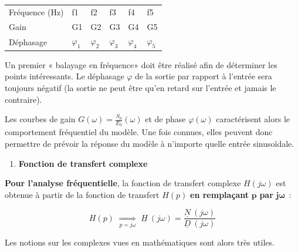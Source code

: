 \begin{longtable}[]{@{}
  >{\raggedright\arraybackslash}p{}
  >{\raggedright\arraybackslash}p{}
  >{\raggedright\arraybackslash}p{}
  >{\raggedright\arraybackslash}p{}
  >{\raggedright\arraybackslash}p{}
  >{\raggedright\arraybackslash}p{}@{}}
\toprule\noalign{}
\endhead
\bottomrule\noalign{}
\endlastfoot
Fréquence (Hz) & f1 & f2 & f3 & f4 & f5 \\
Gain & G1 & G2 & G3 & G4 & G5 \\
Déphasage & \(\varphi_{1}\) & \(\varphi_{2}\) & \(\varphi_{3}\) & \(\varphi_{4}\) & \(\varphi_{5}\) \\
\end{longtable}

Un premier « balayage en fréquence» doit être réalisé afin de déterminer les points intéressants. Le déphasage \(\varphi\) de la sortie par rapport à l'entrée sera toujours négatif (la sortie ne peut être qu'en retard sur l'entrée et jamais le contraire).

Les courbes de gain \(G(\omega) = \frac{S_{0}}{E_{0}}(\omega)\) et de phase \(\varphi(\omega)\) caractérisent alors le comportement fréquentiel du modèle. Une fois connues, elles peuvent donc permettre de prévoir la réponse du modèle à n'importe quelle entrée sinusoïdale.

\begin{enumerate}
\def\labelenumi{\arabic{enumi}.}
\setcounter{enumi}{2}
\item
  \protect\hypertarget{_Toc387521156}{}{}\textbf{Fonction de transfert complexe}
\end{enumerate}

\textbf{Pour l'analyse fréquentielle}, la fonction de transfert complexe \(H(j\omega)\) est obtenue à partir de la fonction de transfert \(H(p)\) \textbf{en remplaçant} \(\mathbf{p}\) \textbf{par} \(\mathbf{j\omega}\)~:

\[H(p)\mspace{6mu}\underset{p = j\omega}{\Rightarrow}\mspace{6mu}\underline{H}\ (j\omega) = \frac{\underline{N}\ (j\omega)}{\underline{D}\ (j\omega)}\]

Les notions sur les complexes vues en mathématiques sont alors très utiles.

